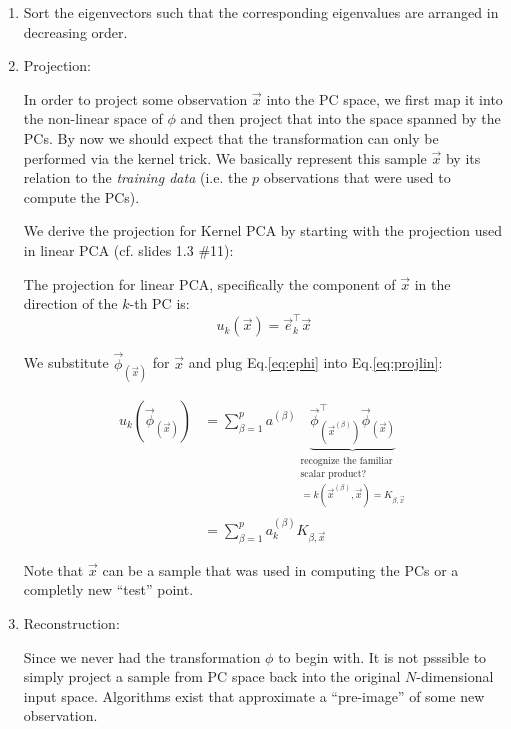 \begin{enumerate}
\newpage

\item Sort the eigenvectors such that the corresponding eigenvalues are arranged in decreasing order. 


\item Projection:

In order to project some observation $\vec x$ into the PC space, we first map it into the non-linear space of $\phi$ 
and then project that into the space spanned by the PCs. 
By now we should expect that the transformation can only be performed via the kernel trick. 
We basically represent this sample $\vec x$ by its relation to the \emph{training data} 
(i.e. the $p$ observations that were used to compute the PCs).

We derive the projection for Kernel PCA by starting with the projection used in linear PCA (cf. slides 1.3 \#11):

The projection for linear PCA, specifically the component of $\vec x$ in the direction of the $k$-th PC is:
\begin{equation}
\label{eq:projlin}
u_k(\vec x) = \vec e_k^\top \vec x
\end{equation}

We substitute $\vec \phi_{(\vec x)}$ for $\vec x$ and plug Eq.\ref{eq:ephi} into Eq.\ref{eq:projlin}:

\begin{align}
\label{eq:projk1}
u_k(\vec \phi_{(\vec x)}) &= \sum^{p}_{\beta=1} a^{(\beta)} 
\underbrace{
\vec{\phi}^\top_{(\vec{x}^{(\beta)})} \vec \phi_{(\vec x)}
}_{\substack{
\text{recognize the familiar}\\
\text{scalar product?}
\\ =k(\vec x^{(\beta)}, \vec x) = K_{\beta,\vec x}}}\\
&= \sum_{\beta=1}^{p} a_k^{(\beta)} K_{\beta, \vec x}
\end{align}

Note that $\vec x$ can be a sample that was used in computing the PCs or a completly new ``test'' point.

\item Reconstruction:

Since we never had the transformation $\phi$ to begin with. 
It is not psssible to simply project a sample from PC space back into the original $N$-dimensional input space. 
Algorithms exist that approximate a ``pre-image'' of some new observation.
\end{enumerate}

